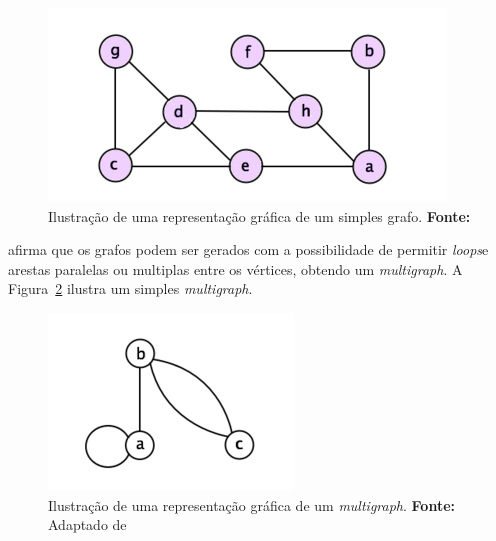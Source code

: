 \begin{figure}[h!]
	\centerline{\includegraphics[scale=0.77]{./imagens/simple_graph.png}}
	\caption[Ilustração de uma representação gráfica de um simples grafo]
	{Ilustração de uma representação gráfica de um simples grafo. \textbf{Fonte:} }
	\label{fig:ilustracao_grafo_simples}
\end{figure}

\par {} afirma que os grafos podem ser gerados com a possibilidade de permitir \textit{loops}\footnotemark[4] e arestas paralelas ou multiplas entre os vértices, obtendo um \textit{multigraph}. A Figura~\ref{fig:ilustracao_multigrafo_simples} ilustra um simples \textit{multigraph}.


\begin{figure}[h!]
	\centerline{\includegraphics[scale=0.9]{./imagens/multigraph_example.png}}
	\caption[Ilustração de uma representação gráfica de um \textit{multigraph}]
	{Ilustração de uma representação gráfica de um \textit{multigraph}. \textbf{Fonte:} Adaptado de }
	\label{fig:ilustracao_multigrafo_simples}
\end{figure}

